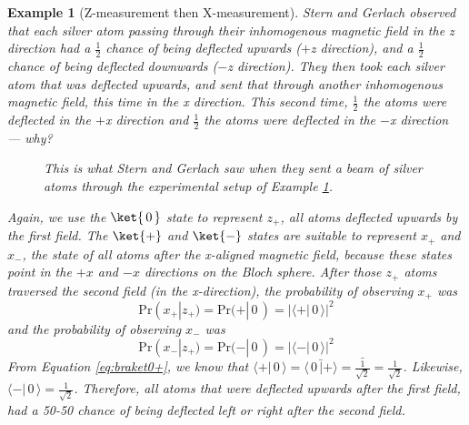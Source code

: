 \documentclass{article}
\newtheorem{example}{Example}
\newcommand*\conj[1]{\bar{#1}}
\newcommand{\abs}[1]{{\big\vert} #1 {\big\vert}}
\newcommand{\kz}[1]{\ket{\,#1\,}}
\newcommand{\kx}[1]{\ket{#1}}
\begin{document}
\begin{example}[Z-measurement then X-measurement] \label{example:sterngerlachzx}
	Stern and Gerlach observed that each silver atom passing through their inhomogenous magnetic field in the z direction had a $\frac{1}{2}$ chance of being deflected upwards ($+$z direction), and a $\frac{1}{2}$ chance of being deflected downwards ($-$z direction).  They then took each silver atom that was deflected upwards, and sent that through another inhomogenous magnetic field, this time in the x direction.  This second time, $\frac{1}{2}$ the atoms were deflected in the $+$x direction and $\frac{1}{2}$ the atoms were deflected in the $-$x direction --- why?
	
	\begin{figure}[h!]
		\caption{This is what Stern and Gerlach saw when they sent a beam of silver atoms through the experimental setup of Example \ref{example:sterngerlachzx}.}
	\end{figure}

	\textnormal{Again, we use the $\kz0$ state to represent $z_+$, all atoms deflected upwards by the first field.  The $\kx+$ and $\kx-$ states are suitable to represent $x_+$ and $x_-$, the state of all atoms after the x-aligned magnetic field, because these states point in the $+x$ and $-x$ directions on the Bloch sphere.	After those $z_+$ atoms traversed the second field (in the x-direction), the probability of observing $x_+$ was
	\begin{equation}
		\text{Pr}(x_+|z_+) = \text{Pr}(+|\,0\,) = \abs{\langle+|\,0\,\rangle}^2
	\end{equation}
	and the probability of observing $x_-$ was
	\begin{equation}
		\text{Pr}(x_-|z_+) = \text{Pr}(-|\,0\,) = \abs{\langle-|\,0\,\rangle}^2
	\end{equation}
	From Equation \ref{eq:braket0+}, we know that $\langle+|\,0\,\rangle = \conj{\langle\,0\,|+\rangle} = \conj{\frac{1}{\sqrt{2}}} = \frac{1}{\sqrt{2}}$.  Likewise, $\langle-|\,0\,\rangle = \frac{1}{\sqrt{2}}$.  Therefore, all atoms that were deflected upwards after the first field, had a 50-50 chance of being deflected left or right after the second field.}
\end{example}
\end{document}
